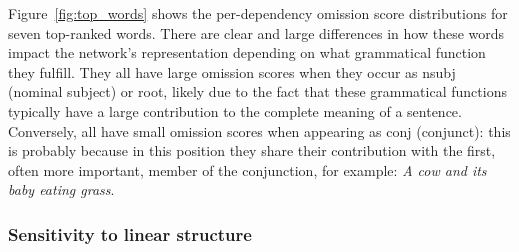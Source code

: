 Figure~\ref{fig:top_words} shows the per-dependency 
omission score distributions for seven top-ranked words.
There are clear and large differences in how these words
impact the network's representation depending on what grammatical
function they fulfill. They all have large omission scores when they
occur as {\sc nsubj} (nominal subject) or {\sc root}, likely due to the fact that these
grammatical functions typically have a large contribution to the
complete meaning of a sentence.  Conversely, all have small omission 
scores when appearing as {\sc conj} (conjunct): this is probably because in this position
they share their contribution with the first, often more important,
member of the conjunction, for example: {\it A cow and its baby eating
  grass}. 

\subsubsection{Sensitivity to linear structure}
\label{subsec:information-struct}

